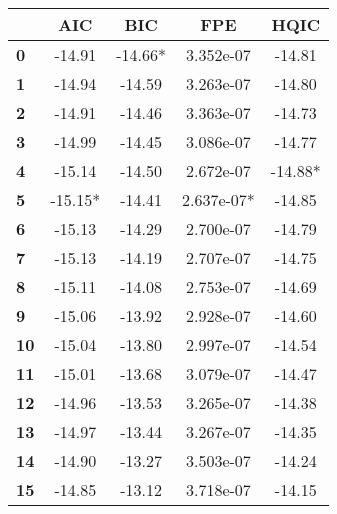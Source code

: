 \begin{center}
\begin{tabular}{lcccc}
\toprule
            & \textbf{AIC} & \textbf{BIC} & \textbf{FPE} & \textbf{HQIC}  \\
\midrule
\textbf{0}  &      -14.91  &     -14.66*  &   3.352e-07  &       -14.81   \\
\textbf{1}  &      -14.94  &      -14.59  &   3.263e-07  &       -14.80   \\
\textbf{2}  &      -14.91  &      -14.46  &   3.363e-07  &       -14.73   \\
\textbf{3}  &      -14.99  &      -14.45  &   3.086e-07  &       -14.77   \\
\textbf{4}  &      -15.14  &      -14.50  &   2.672e-07  &      -14.88*   \\
\textbf{5}  &     -15.15*  &      -14.41  &  2.637e-07*  &       -14.85   \\
\textbf{6}  &      -15.13  &      -14.29  &   2.700e-07  &       -14.79   \\
\textbf{7}  &      -15.13  &      -14.19  &   2.707e-07  &       -14.75   \\
\textbf{8}  &      -15.11  &      -14.08  &   2.753e-07  &       -14.69   \\
\textbf{9}  &      -15.06  &      -13.92  &   2.928e-07  &       -14.60   \\
\textbf{10} &      -15.04  &      -13.80  &   2.997e-07  &       -14.54   \\
\textbf{11} &      -15.01  &      -13.68  &   3.079e-07  &       -14.47   \\
\textbf{12} &      -14.96  &      -13.53  &   3.265e-07  &       -14.38   \\
\textbf{13} &      -14.97  &      -13.44  &   3.267e-07  &       -14.35   \\
\textbf{14} &      -14.90  &      -13.27  &   3.503e-07  &       -14.24   \\
\textbf{15} &      -14.85  &      -13.12  &   3.718e-07  &       -14.15   \\
\bottomrule
\end{tabular}
\end{center}